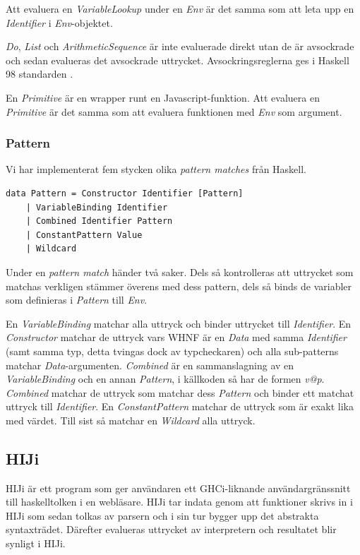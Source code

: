 Att evaluera en \emph{VariableLookup} under en \emph{Env} är det samma som att leta upp en \emph{Identifier} i \emph{Env}-objektet.

\emph{Do}, \emph{List} och \emph{ArithmeticSequence} är inte evaluerade direkt utan de är avsockrade och sedan evalueras det avsockrade uttrycket. Avsockringsreglerna ges i Haskell 98 standarden \citep{haskell98chap3}.

En \emph{Primitive} är en wrapper runt en Javascript-funktion. Att evaluera en \emph{Primitive} är det samma som att evaluera funktionen med \emph{Env} som argument.

\subsubsection{Pattern}
Vi har implementerat fem stycken olika \emph{pattern matches} från Haskell.
\begin{lstlisting}
data Pattern = Constructor Identifier [Pattern]
    | VariableBinding Identifier
    | Combined Identifier Pattern
    | ConstantPattern Value
    | Wildcard
\end{lstlisting}
Under en \emph{pattern match} händer två saker. Dels så kontrolleras att uttrycket som matchas verkligen stämmer överens med dess pattern, dels så binds de variabler som definieras i \emph{Pattern} till \emph{Env}. 

En \emph{VariableBinding} matchar alla uttryck och binder uttrycket till \emph{Identifier}. En \emph{Constructor} matchar de uttryck vars WHNF är en \emph{Data} med samma \emph{Identifier} (samt samma typ, detta tvingas dock av typcheckaren) och alla sub-patterns matchar \emph{Data}-argumenten. \emph{Combined} är en sammanslagning av en \emph{VariableBinding} och en annan \emph{Pattern}, i källkoden så har de formen \emph{v@p}. \emph{Combined} matchar de uttryck som matchar dess \emph{Pattern} och binder ett matchat uttryck till \emph{Identifier}. En \emph{ConstantPattern} matchar de uttryck som är exakt lika med värdet. Till sist så matchar en \emph{Wildcard} alla uttryck.

\subsection{HIJi}

HIJi är ett program som ger användaren ett GHCi-liknande användargränssnitt till haskelltolken i en webläsare. 
HIJi tar indata genom att funktioner skrivs in i HIJi som sedan tolkas av parsern och i sin tur bygger upp det abstrakta syntaxträdet. Därefter evalueras uttrycket av interpretern och resultatet blir synligt i HIJi.

